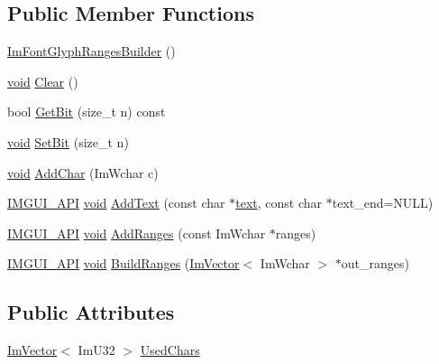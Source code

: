 \subsection*{Public Member Functions}
\begin{DoxyCompactItemize}
\item 
\hyperlink{structImFontGlyphRangesBuilder_aaee7673423cb7e29d43ea3901628c870}{Im\+Font\+Glyph\+Ranges\+Builder} ()
\item 
\hyperlink{imgui__impl__opengl3__loader_8h_ac668e7cffd9e2e9cfee428b9b2f34fa7}{void} \hyperlink{structImFontGlyphRangesBuilder_a918c20b2291c13acd86b5fbbf6097b7f}{Clear} ()
\item 
bool \hyperlink{structImFontGlyphRangesBuilder_a6b1480f843b82db098205872b1309f47}{Get\+Bit} (size\+\_\+t n) const
\item 
\hyperlink{imgui__impl__opengl3__loader_8h_ac668e7cffd9e2e9cfee428b9b2f34fa7}{void} \hyperlink{structImFontGlyphRangesBuilder_a12474f5e042b7097a515db0abb71e3e6}{Set\+Bit} (size\+\_\+t n)
\item 
\hyperlink{imgui__impl__opengl3__loader_8h_ac668e7cffd9e2e9cfee428b9b2f34fa7}{void} \hyperlink{structImFontGlyphRangesBuilder_a6d3f5e3e377a73f4f4324c4cf98600dd}{Add\+Char} (Im\+Wchar c)
\item 
\hyperlink{imgui_8h_a43829975e84e45d1149597467a14bbf5}{I\+M\+G\+U\+I\+\_\+\+A\+PI} \hyperlink{imgui__impl__opengl3__loader_8h_ac668e7cffd9e2e9cfee428b9b2f34fa7}{void} \hyperlink{structImFontGlyphRangesBuilder_ade9770bde0f63b4630df30402f3619cf}{Add\+Text} (const char $\ast$\hyperlink{game__play__state_8cpp_a295b62c787445f811e691da4b10f6be4}{text}, const char $\ast$text\+\_\+end=N\+U\+LL)
\item 
\hyperlink{imgui_8h_a43829975e84e45d1149597467a14bbf5}{I\+M\+G\+U\+I\+\_\+\+A\+PI} \hyperlink{imgui__impl__opengl3__loader_8h_ac668e7cffd9e2e9cfee428b9b2f34fa7}{void} \hyperlink{structImFontGlyphRangesBuilder_ac28bc574d4d34d3a2889cda34470ae71}{Add\+Ranges} (const Im\+Wchar $\ast$ranges)
\item 
\hyperlink{imgui_8h_a43829975e84e45d1149597467a14bbf5}{I\+M\+G\+U\+I\+\_\+\+A\+PI} \hyperlink{imgui__impl__opengl3__loader_8h_ac668e7cffd9e2e9cfee428b9b2f34fa7}{void} \hyperlink{structImFontGlyphRangesBuilder_abc11a683e1b345299c42abd8b6c422a5}{Build\+Ranges} (\hyperlink{structImVector}{Im\+Vector}$<$ Im\+Wchar $>$ $\ast$out\+\_\+ranges)
\end{DoxyCompactItemize}
\subsection*{Public Attributes}
\begin{DoxyCompactItemize}
\item 
\hyperlink{structImVector}{Im\+Vector}$<$ Im\+U32 $>$ \hyperlink{structImFontGlyphRangesBuilder_af83d63600e78e2454a78f0d736ba8ee4}{Used\+Chars}
\end{DoxyCompactItemize}


